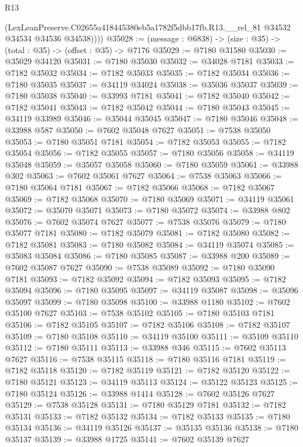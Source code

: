 \begin{lexlean}{R13}
\begin{coremodule}
          (LexLeanPreserve.C02655a418445380eb5a1782f5dbb17fb.R13.__rel_81
            @34532
            @34534
            @34536
            @34538))))
@35028 := (message : @6838) -> (size : @35) -> (total : @35) -> (offset : @35) -> @7176
@35029 := @7180 @31580
@35030 := @35029 @34120
@35031 := @7180 @35030
@35032 := @34028 @7181
@35033 := @7182 @35032
@35034 := @7182 @35033
@35035 := @7182 @35034
@35036 := @7180 @35035
@35037 := @34119 @34024
@35038 := @35036 @35037
@35039 := @7180 @35038
@35040 := @33993 @7181
@35041 := @7182 @35040
@35042 := @7182 @35041
@35043 := @7182 @35042
@35044 := @7180 @35043
@35045 := @34119 @33989
@35046 := @35044 @35045
@35047 := @7180 @35046
@35048 := @33988 @587
@35050 := @7602 @35048 @7627
@35051 := @7538 @35050
@35053 := @7180 @35051 @7181
@35054 := @7182 @35053
@35055 := @7182 @35054
@35056 := @7182 @35055
@35057 := @7180 @35056
@35058 := @34119 @35048
@35059 := @35057 @35058
@35060 := @7180 @35059
@35061 := @33988 @302
@35063 := @7602 @35061 @7627
@35064 := @7538 @35063
@35066 := @7180 @35064 @7181
@35067 := @7182 @35066
@35068 := @7182 @35067
@35069 := @7182 @35068
@35070 := @7180 @35069
@35071 := @34119 @35061
@35072 := @35070 @35071
@35073 := @7180 @35072
@35074 := @33988 @802
@35076 := @7602 @35074 @7627
@35077 := @7538 @35076
@35079 := @7180 @35077 @7181
@35080 := @7182 @35079
@35081 := @7182 @35080
@35082 := @7182 @35081
@35083 := @7180 @35082
@35084 := @34119 @35074
@35085 := @35083 @35084
@35086 := @7180 @35085
@35087 := @33988 @200
@35089 := @7602 @35087 @7627
@35090 := @7538 @35089
@35092 := @7180 @35090 @7181
@35093 := @7182 @35092
@35094 := @7182 @35093
@35095 := @7182 @35094
@35096 := @7180 @35095
@35097 := @34119 @35087
@35098 := @35096 @35097
@35099 := @7180 @35098
@35100 := @33988 @1180
@35102 := @7602 @35100 @7627
@35103 := @7538 @35102
@35105 := @7180 @35103 @7181
@35106 := @7182 @35105
@35107 := @7182 @35106
@35108 := @7182 @35107
@35109 := @7180 @35108
@35110 := @34119 @35100
@35111 := @35109 @35110
@35112 := @7180 @35111
@35113 := @33988 @346
@35115 := @7602 @35113 @7627
@35116 := @7538 @35115
@35118 := @7180 @35116 @7181
@35119 := @7182 @35118
@35120 := @7182 @35119
@35121 := @7182 @35120
@35122 := @7180 @35121
@35123 := @34119 @35113
@35124 := @35122 @35123
@35125 := @7180 @35124
@35126 := @33988 @1414
@35128 := @7602 @35126 @7627
@35129 := @7538 @35128
@35131 := @7180 @35129 @7181
@35132 := @7182 @35131
@35133 := @7182 @35132
@35134 := @7182 @35133
@35135 := @7180 @35134
@35136 := @34119 @35126
@35137 := @35135 @35136
@35138 := @7180 @35137
@35139 := @33988 @1725
@35141 := @7602 @35139 @7627

\end{coremodule}
\end{lexlean}
